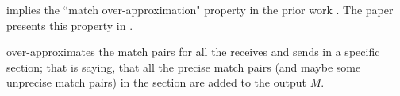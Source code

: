  implies the ``match over-approximation" property in the prior work \cite{DBLP:conf/kbse/HuangMM13}. The paper presents this property in . 

\begin{lemma}
 over-approximates the match pairs for all the receives and sends in a specific section; that is saying, that all the precise match pairs (and maybe some unprecise match pairs) in the section are added to the output $M$.
\label{lemma:match}
\end{lemma}



